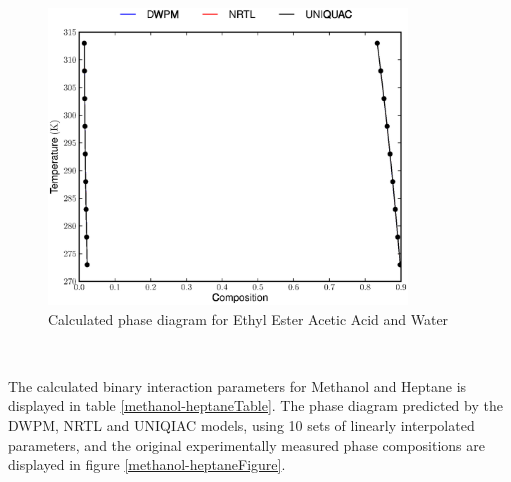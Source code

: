 \begin{figure}[hp]
\centering
\includegraphics[width = 0.85\textwidth]{Results_Parts/BinaryParams/ethylesteraceticacid-water/PhaseDiagram.eps}
\caption{Calculated phase diagram for Ethyl Ester Acetic Acid and Water} \label{ethylesteraceticacid-waterFigure}
\end{figure}\

\clearpage

The calculated binary interaction parameters for Methanol and Heptane is displayed in table \ref{methanol-heptaneTable}. The phase diagram predicted by the DWPM, NRTL and UNIQIAC models, using 10 sets of linearly interpolated parameters, and the original experimentally measured phase compositions are displayed in figure \ref{methanol-heptaneFigure}.\\

